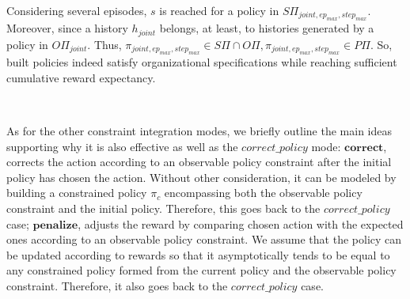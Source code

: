 \begin{proofoutline}
    Considering several episodes, $s$ is reached for a policy in $\allowbreak S\Pi_{joint,ep_{max},step_{max}}$. Moreover, since a history $h_{joint}$ belongs, at least, to histories generated by a policy in $O\Pi_{joint}$. Thus, $\pi_{joint,ep_{max},step_{max}} \in S\Pi \cap O\Pi, \pi_{joint,ep_{max},step_{max}} \in P\Pi$. So, built policies indeed satisfy organizational specifications while reaching sufficient cumulative reward expectancy.

    \

    As for the other constraint integration modes, we briefly outline the main ideas supporting why it is also effective as well as the $correct\_policy$ mode:
    $\mathbf{correct}$, corrects the action according to an observable policy constraint after the initial policy has chosen the action. Without other consideration, it can be modeled by building a constrained policy $\pi_c$ encompassing both the observable policy constraint and the initial policy. Therefore, this goes back to the $correct\_policy$ case;
    $\mathbf{penalize}$, adjusts the reward by comparing chosen action with the expected ones according to an observable policy constraint. We assume that the policy can be updated according to rewards so that it asymptotically tends to be equal to any constrained policy formed from the current policy and the observable policy constraint. Therefore, it also goes back to the $correct\_policy$ case.

\end{proofoutline}